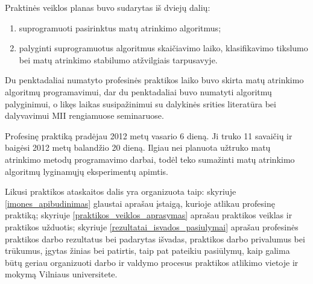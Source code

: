 Praktinės veiklos planas buvo sudarytas iš dviejų dalių: 
\begin{enumerate}
 \item suprogramuoti pasirinktus matų atrinkimo algoritmus;
 \item palyginti suprogramuotus algoritmus skaičiavimo laiko, klasifikavimo tikslumo bei matų atrinkimo stabilumo atžvilgiais tarpusavyje.
\end{enumerate}
Du penktadaliai numatyto profesinės praktikos laiko buvo skirta matų atrinkimo algoritmų programavimui, dar du penktadaliai buvo numatyti algoritmų palyginimui, o likęs laikas susipažinimui su dalykinės srities literatūra bei dalyvavimui MII rengiamuose seminaruose.

Profesinę praktiką pradėjau 2012 metų vasario 6 dieną. Ji truko 11 savaičių ir baigėsi 2012 metų balandžio 20 dieną. Ilgiau nei planuota užtruko matų atrinkimo metodų programavimo darbai, todėl teko sumažinti matų atrinkimo algoritmų lyginamųjų eksperimentų apimtis.

Likusi praktikos ataskaitos dalis yra organizuota taip: skyriuje \ref{imones_apibudinimas} glaustai aprašau įstaigą, kurioje atlikau profesinę praktiką; skyriuje  \ref{praktikos_veiklos_aprasymas} aprašau praktikos veiklas ir praktikos užduotis; skyriuje \ref{rezultatai_isvados_pasiulymai} aprašau profesinės praktikos darbo rezultatus bei padarytas išvadas, praktikos darbo privalumus bei trūkumus, įgytas žinias bei patirtis, taip pat pateikiu pasiūlymų, kaip galima būtų geriau organizuoti darbo ir valdymo procesus praktikos atlikimo vietoje ir mokymą Vilniaus universitete.